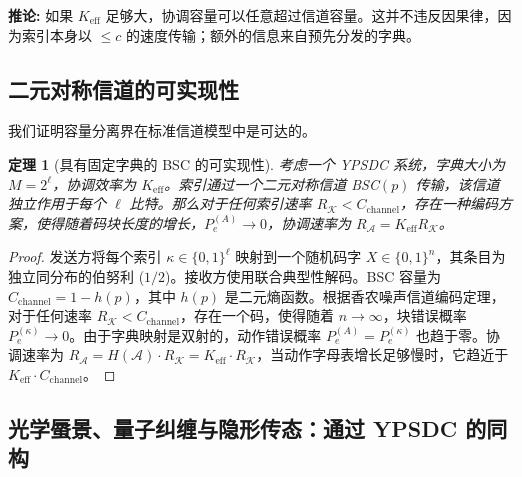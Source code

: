 \documentclass[12pt,a4paper]{article}
\newtheorem{theorem}{定理}[section]
\theoremstyle{remark}
\newcommand{\Keff}{K_{\mathrm{eff}}}
\begin{document}
	\noindent
	\textbf{推论:} 如果 $\Keff$ 足够大，协调容量可以任意超过信道容量。这并不违反因果律，因为索引本身以 $\le c$ 的速度传输；额外的信息来自预先分发的字典。
	
	\subsection{二元对称信道的可实现性}
	\label{subsec:BSC-achievability}
	
	我们证明容量分离界在标准信道模型中是可达的。
	
	\begin{theorem}[具有固定字典的 BSC 的可实现性]
		考虑一个 YPSDC 系统，字典大小为 \(M = 2^\ell\)，协调效率为 \(K_{\mathrm{eff}}\)。索引通过一个二元对称信道 BSC\((p)\) 传输，该信道独立作用于每个 \(\ell\) 比特。那么对于任何索引速率 \(R_{\mathcal{K}} < C_{\mathrm{channel}}\)，存在一种编码方案，使得随着码块长度的增长，\(P_e^{(A)} \to 0\)，协调速率为 \(R_{\mathcal{A}} = K_{\mathrm{eff}} R_{\mathcal{K}}\)。
	\end{theorem}
	
	\begin{proof}
		发送方将每个索引 \(\kappa \in \{0,1\}^\ell\) 映射到一个随机码字 \(X \in \{0,1\}^n\)，其条目为独立同分布的伯努利 (\(1/2\))。接收方使用联合典型性解码。BSC 容量为 \(C_{\mathrm{channel}} = 1 - h(p)\)，其中 \(h(p)\) 是二元熵函数。根据香农噪声信道编码定理，对于任何速率 \(R_{\mathcal{K}} < C_{\mathrm{channel}}\)，存在一个码，使得随着 \(n \to \infty\)，块错误概率 \(P_e^{(\kappa)} \to 0\)。由于字典映射是双射的，动作错误概率 \(P_e^{(A)} = P_e^{(\kappa)}\) 也趋于零。协调速率为 \(R_{\mathcal{A}} = H(\mathcal{A}) \cdot R_{\mathcal{K}} = K_{\mathrm{eff}} \cdot R_{\mathcal{K}}\)，当动作字母表增长足够慢时，它趋近于 \(K_{\mathrm{eff}} \cdot C_{\mathrm{channel}}\)。
	\end{proof}
	
	\subsection{光学蜃景、量子纠缠与隐形传态：通过 YPSDC 的同构}
	\label{subsec:mirage-ypsdc}
	
\end{document}
